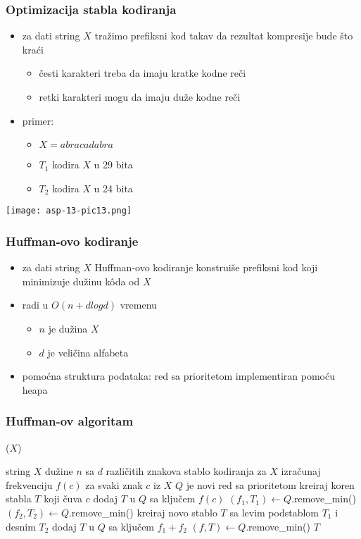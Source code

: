 \documentclass[compress,aspectratio=169]{beamer}
\begin{document}
\begin{frame}[fragile]
  \frametitle{Optimizacija stabla kodiranja}
  \begin{itemize}
    \item za dati string $X$ tražimo prefiksni kod takav da rezultat 
    kompresije bude što kraći
    \begin{itemize}
      \item česti karakteri treba da imaju kratke kodne reči
      \item retki karakteri mogu da imaju duže kodne reči
    \end{itemize}
    \item primer:
    \begin{itemize}
      \item $X = abracadabra$
      \item $T_{1}$ kodira $X$ u 29 bita
      \item $T_{2}$ kodira $X$ u 24 bita
    \end{itemize}
  \end{itemize}
  \begin{center}
    \texttt{[image: asp-13-pic13.png]}
  \end{center}
\end{frame}

\begin{frame}[fragile]
  \frametitle{Huffman-ovo kodiranje}
  \begin{itemize}
    \item za dati string $X$ Huffman-ovo kodiranje konstruiše prefiksni 
    kod koji minimizuje dužinu kôda od $X$
    \item radi u $O(n + d log d)$ vremenu
    \begin{itemize}
      \item $n$ je dužina $X$ 
      \item $d$ je veličina alfabeta
    \end{itemize}
    \item pomoćna struktura podataka: red sa prioritetom implementiran pomoću heapa
  \end{itemize}
\end{frame}

\begin{frame}
  \frametitle{Huffman-ov algoritam}
  ($X$)
  \begin{algorithmic}
    \REQUIRE string $X$ dužine $n$ sa $d$ različitih znakova
    \ENSURE stablo kodiranja za $X$
    \STATE izračunaj frekvenciju $f(c)$ za svaki znak $c$ iz $X$
    \STATE $Q$ je novi red sa prioritetom
      \STATE kreiraj koren stabla $T$ koji čuva $c$
      \STATE dodaj $T$ u $Q$ sa ključem $f(c)$
    \ENDFOR
      \STATE $(f_{1},T_{1}) \leftarrow Q$.remove\_min()
      \STATE $(f_{2},T_{2}) \leftarrow Q$.remove\_min()
      \STATE kreiraj novo stablo $T$ sa levim podstablom $T_{1}$ i desnim $T_{2}$
      \STATE dodaj $T$ u $Q$ sa ključem $f_{1} + f_{2}$
    \ENDWHILE
    \STATE $(f,T) \leftarrow Q$.remove\_min()
    \RETURN $T$
  \end{algorithmic}    
\end{frame}
\end{document}
